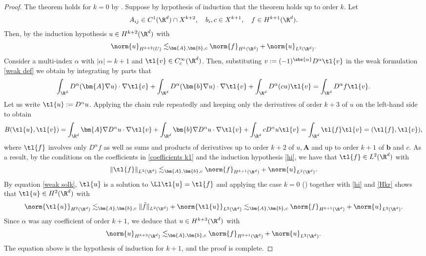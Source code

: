 \documentclass[
    a4paper,
    DIV=14,
    abstract=true,
    numbers=noenddot
]{scrartcl}
\begin{document}
\begin{proof}
    The theorem holds for $k=0$ by .
    Suppose by hypothesis of induction that the theorem holds up to order $k$. Let
    \begin{align}\label{coefficients k1}
        A_{ij} \in C^{1}(\R^d)\cap X^{k+2}, \quad b_i,c \in X^{k+1}, \quad f \in H^{k+1}(\R^d).
    \end{align}
    Then, by the induction hypothesis $u \in H^{k+2}(\R^d)$ with
    \begin{align}\label{hi}
        \norm{u}_{H^{k+2}(U)} \lesssim_{\bm{A},\bm{b},c} \norm{f}_{H^k(\R^d)}+\norm{u}_{L^2(\R^d)}.
    \end{align}
    Consider a multi-index $\alpha$ with $|\alpha|=k+1$ and $\tl{v } \in C_c^\infty(\R^d)$. Then, substituting  $v := (-1)^{\abs{\alpha} } D^\alpha \tl{v}$ in the weak formulation \eqref{weak def} we obtain by integrating by parts that
    \begin{align*}
        \int_{\R^d} D^\alpha(\bm{A} \nabla u) \cdot \nabla \tl{v} +\int_{\R^d} D^\alpha(\bm{b} \nabla u) \cdot \nabla \tl{v} +\int_{\R^d} D^\alpha (c u) \tl{v} =\int_{\R^d} D^\alpha f \tl{v}.
    \end{align*}
    Let us write $\tl{u}:= D^\alpha u $. Applying the chain rule repeatedly and keeping only the derivatives of order $k+3$ of $u$ on the left-hand side to obtain
    \begin{align}\label{weak solk}
        B(\tl{u},\tl{v} ) = \int_{\R^d} \bm{A} \nabla D^\alpha u \cdot \nabla \tl{v} +\int_{\R^d} \bm{b} \nabla D^\alpha u \cdot \nabla \tl{v} +\int_{\R^d} c D^\alpha u \tl{v} =\int_{\R^d} \tl{f} \tl{v}= (\tl{f} ,\tl{v}),
    \end{align}
    where $\tl{f}$ involves only $D^\alpha f$ as well as sums and products of derivatives up to order $k+2$ of $u,\bm{A}$ and up to order $k+1$ of $ \bm{b}$ and $c$. As a result, by the conditions on the coefficients in \eqref{coefficients k1} and the induction hypothesis \eqref{hi}, we have that $\tl{f} \in L^2(\R^d)$ with
    \begin{align}\label{Hkr}
        \|{\tl{f}}\|_{L^2(\R^d)} \lesssim_{\bm{A},\bm{b},c} \norm{f}_{H^{k+1}(\R^d)}+\norm{u}_{L^2(\R^d)}.
    \end{align}
    By equation \eqref{weak solk}, $\tl{u}$ is a solution to $\Ll \tl{u}= \tl{f}  $  and applying the case $k=0$ () together with \eqref{hi}  and \eqref{Hkr} shows that $\tl{u} \in H^{2}(\R^d)$ with
    \begin{align*}
        \norm{\tl{u}}_{H^{2}(\R^d)} \lesssim_{\bm{A},\bm{b},c} \|\tilde{f}\|_{L^2(\R^d)}+\norm{\tl{u}}_{L^2(\R^d)} \lesssim_{\bm{A},\bm{b},c} \norm{f}_{H^{k+1}(\R^d)}+\norm{u}_{L^2(\R^d)}.
    \end{align*}
    Since $\alpha$ was any coefficient of order $k+1$, we deduce that $u \in H^{k+3}(\R^d) $ with
    \begin{align*}
        \norm{u}_{H^{k+3}(\R^d)} \lesssim_{\bm{A},\bm{b},c} \norm{f}_{H^{k+1}(\R^d)}+\norm{u}_{L^2(\R^d)}.
    \end{align*}
    The equation above is the hypothesis of induction for $k+1$, and the proof is complete.
\end{proof}
\end{document}
